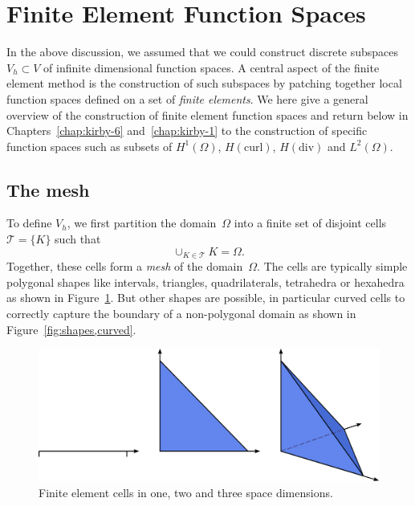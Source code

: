 \section{Finite Element Function Spaces}

In the above discussion, we assumed that we could construct discrete
subspaces $V_h \subset V$ of infinite dimensional function spaces.  A
central aspect of the finite element method is the construction of
such subspaces by patching together local function spaces defined on a
set of \emph{finite elements}. We here give a general overview of the
construction of finite element function spaces and return below in
Chapters~\ref{chap:kirby-6} and~\ref{chap:kirby-1} to the construction of
specific function spaces such as subsets of $H^1(\Omega)$,
$H(\mathrm{curl})$, $H(\mathrm{div})$ and $L^2(\Omega)$.

\subsection{The mesh}

To define $V_h$, we first partition the domain~$\Omega$ into a finite
set of disjoint cells $\mathcal{T} = \{K\}$ such that
\begin{displaymath}
  \cup_{K\in\mathcal{T}} K = \Omega.
\end{displaymath}
Together, these cells form a \emph{mesh} of the domain~$\Omega$. The
cells are typically simple polygonal shapes like intervals, triangles,
quadrilaterals, tetrahedra or hexahedra as shown in
Figure~\ref{fig:shapes}. But other shapes are possible, in particular
curved cells to correctly capture the boundary of a non-polygonal
domain as shown in Figure~\ref{fig:shapes,curved}.

\begin{figure}
  \begin{center}
      \includegraphics[width=\largefig]{chapters/kirby-7/pdf/cells.pdf}
      \caption{Finite element cells in one, two and three space dimensions.}
    \label{fig:shapes}
  \end{center}
\end{figure}

